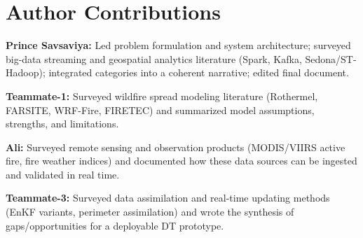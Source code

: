 \documentclass[acmsmall,screen,nonacm]{acmart}
\begin{document}
\section*{Author Contributions}
\textbf{Prince Savsaviya:} Led problem formulation and system architecture; surveyed big-data streaming and geospatial
analytics literature (Spark, Kafka, Sedona/ST-Hadoop); integrated categories into a coherent narrative; edited final document.

\textbf{Teammate-1:} Surveyed wildfire spread modeling literature (Rothermel, FARSITE, WRF-Fire, FIRETEC) and summarized
model assumptions, strengths, and limitations.

\textbf{Ali:} Surveyed remote sensing and observation products (MODIS/VIIRS active fire, fire weather indices) and
documented how these data sources can be ingested and validated in real time.

\textbf{Teammate-3:} Surveyed data assimilation and real-time updating methods (EnKF variants, perimeter assimilation) and
wrote the synthesis of gaps/opportunities for a deployable DT prototype.



\end{document}
